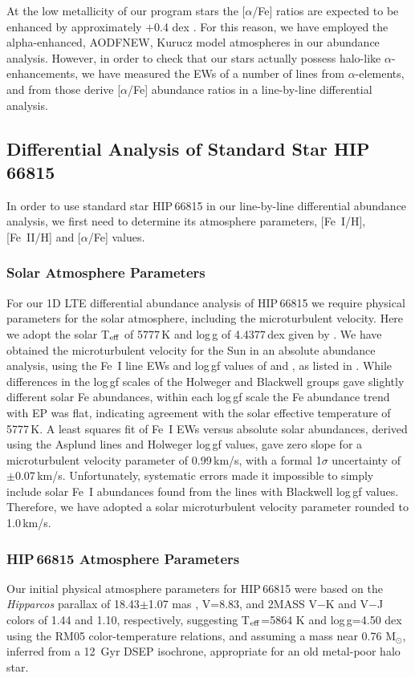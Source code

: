 \documentclass[revtex4]{emulateapj}
\begin{document}
At the low metallicity of our program stars the [$\alpha$/Fe] ratios are expected to be enhanced by approximately $+$0.4 dex \citep[e.g.][]{Wall1962,Conti1967}.  For this reason, we have employed the alpha-enhanced, AODFNEW, Kurucz model atmospheres in our abundance analysis.  However, in order to check that our stars actually possess halo-like $\alpha$-enhancements, we have measured the EWs of a number of lines from $\alpha$-elements, and from those derive [$\alpha$/Fe] abundance ratios in a line-by-line differential analysis.

\subsection{Differential Analysis of Standard Star HIP\,66815}\label{sec:hip66815}
In order to use standard star HIP\,66815 in our line-by-line differential abundance analysis, we first need to determine its atmosphere parameters, [Fe~I/H], [Fe~II/H] and [$\alpha$/Fe] values.

\subsubsection{Solar Atmosphere Parameters}
For our 1D LTE differential abundance analysis of HIP\,66815 we require physical parameters for the solar atmosphere, including the microturbulent velocity.  Here we adopt the solar T$_{\rm eff}$ of 5777\,K and log\,g of 4.4377\,dex given by \citet{AQ2000}.  We have obtained the microturbulent velocity for the Sun in an absolute abundance analysis, using the Fe~I line EWs and log\,gf values of \citet{Black1995a,Black1995b} and \citet{Holweger1995}, as listed in \cite{Asplund2000}.  While differences in the log\,gf scales of the Holweger and Blackwell groups gave slightly different solar Fe abundances, within each log\,gf scale the Fe abundance trend with EP was flat, indicating agreement with the solar effective temperature of 5777\,K.  A least squares fit of Fe~I EWs versus absolute solar abundances, derived using the Asplund lines and Holweger log\,gf values, gave zero slope for a microturbulent velocity parameter of 0.99\,km/s, with a formal 1$\sigma$ uncertainty of $\pm$0.07\,km/s.  Unfortunately, systematic errors made it impossible to simply include solar Fe~I abundances found from the lines with Blackwell log\,gf values.  Therefore, we have adopted a solar microturbulent velocity parameter rounded to 1.0\,km/s.  

\subsubsection{HIP\,66815 Atmosphere Parameters}
Our initial physical atmosphere parameters for HIP\,66815 were based on the \emph{Hipparcos} parallax of 18.43$\pm$1.07 mas \citep{Leeu2007}, V=8.83, and 2MASS V$-$K and V$-$J colors of 1.44 and 1.10, respectively, suggesting T$_{\rm eff}$=5864 K and log\,g=4.50 dex using the RM05 color-temperature relations, and assuming a mass near 0.76 M$_{\odot}$, inferred from a 12~Gyr DSEP isochrone, appropriate for an old metal-poor halo star.
\end{document}

